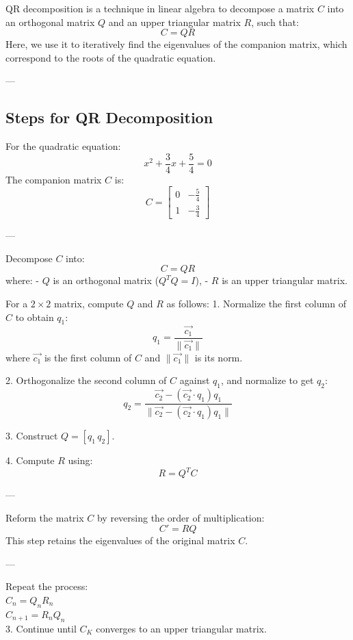 \documentclass[journal]{IEEEtran}
\begin{document}
QR decomposition is a technique in linear algebra to decompose a matrix \( C \) into an orthogonal matrix \( Q \) and an upper triangular matrix \( R \), such that:
\[
C = QR
\]
Here, we use it to iteratively find the eigenvalues of the companion matrix, which correspond to the roots of the quadratic equation.

---

\subsection*{Steps for QR Decomposition}


For the quadratic equation:
\[
x^2 + \frac{3}{4}x + \frac{5}{4} = 0
\]
The companion matrix \( C \) is:
\[
C =
\begin{bmatrix}
0 & -\frac{5}{4} \\
1 & -\frac{3}{4}
\end{bmatrix}
\]

---


Decompose \( C \) into:
\[
C = QR
\]
where:
- \( Q \) is an orthogonal matrix (\( Q^T Q = I \)),
- \( R \) is an upper triangular matrix.

For a \( 2 \times 2 \) matrix, compute \( Q \) and \( R \) as follows:
1. Normalize the first column of \( C \) to obtain \( q_1 \):
\[
q_1 = \frac{\vec{c_1}}{\|\vec{c_1}\|}
\]
where \( \vec{c_1} \) is the first column of \( C \) and \( \|\vec{c_1}\| \) is its norm.

2. Orthogonalize the second column of \( C \) against \( q_1 \), and normalize to get \( q_2 \):
\[
q_2 = \frac{\vec{c_2} - (\vec{c_2} \cdot q_1)q_1}{\|\vec{c_2} - (\vec{c_2} \cdot q_1)q_1\|}
\]

3. Construct \( Q = [q_1 \, q_2] \).

4. Compute \( R \) using:
\[
R = Q^T C
\]

---


Reform the matrix \( C \) by reversing the order of multiplication:
\[
C' = RQ
\]
This step retains the eigenvalues of the original matrix \( C \).

---


Repeat the process:\\
 $C_n=Q_nR_n$\\
 $C_{n+1}=R_nQ_n$\\
3. Continue until \( C_K \) converges to an upper triangular matrix.
\end{document}

